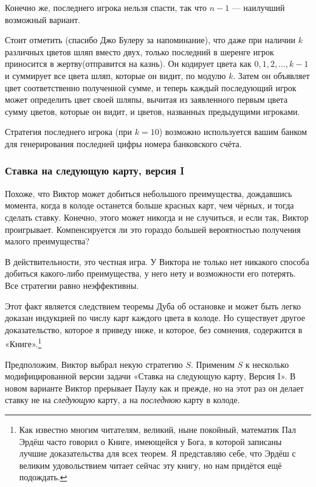 Конечно же, последнего игрока нельзя спасти, так что $n-1$ --- наилучший возможный вариант.
\heart

Стоит отметить (спасибо Джо Булеру %
за напоминание), что даже при наличии $k$ различных цветов шляп вместо двух, только последний в шеренге игрок приносится в жертву(отправится на казнь).
Он кодирует цвета как $0, 1, 2, \dots, k-1$ и суммирует все цвета шляп, которые он видит, по модулю $k$.
Затем он объявляет цвет соответственно полученной сумме, и теперь каждый последующий игрок может определить цвет своей шляпы, вычитая из заявленного первым цвета сумму цветов, которые он видит, и цветов, названных предыдущими игроками.

Стратегия последнего игрока (при $k=10$) возможно используется вашим банком для генерирования последней цифры номера банковского счёта.

\subsubsection*{Ставка на следующую карту, версия I}%

Похоже, что Виктор может добиться небольшого преимущества, дождавшись момента, когда в колоде останется больше красных карт, чем чёрных, и тогда сделать ставку.
Конечно, этого может никогда и не случиться, и если так, Виктор проигрывает.
Компенсируется ли это гораздо большей вероятностью получения малого преимущества?

В действительности, это честная игра. %
У Виктора не только нет никакого способа добиться какого-либо преимущества, у него нету и возможности его потерять.
Все стратегии равно неэффективны.

Этот факт является следствием теоремы Дуба об остановке %
и может быть легко доказан индукцией по числу карт каждого цвета в колоде.
Но существует другое доказательство, которое я приведу ниже, и которое, без сомнения, содержится в «Книге».\footnote{Как известно многим читателям, великий, ныне покойный, математик Пал Эрдёш часто говорил о Книге, имеющейся у Бога, в которой записаны лучшие доказательства для всех теорем.
Я представляю себе, что Эрдёш с великим удовольствием читает сейчас эту книгу, но нам придётся ещё подождать.}

Предположим, Виктор выбрал некую стратегию $S$.
Применим $S$ к несколько модифицированной версии задачи «Ставка на следующую карту,
Версия I».
В новом варианте Виктор прерывает Паулу как и прежде, но на этот раз он делает ставку не на \emph{следующую} карту, а на \emph{последнюю} карту в колоде.

